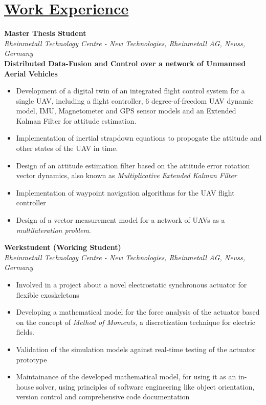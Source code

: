 
\section{\underline{Work Experience}}

\large{\textbf{Master Thesis Student}}
\hfill
\masterarbeitdate\\
\large{\emph{Rheinmetall Technology Centre - New Technologies, Rheinmetall AG, Neuss, Germany}}\\
\large{\textbf{Distributed Data-Fusion and Control over a network of Unmanned Aerial Vehicles}}
\begin{itemize}
    \item Development of a digital twin of an integrated flight control system for a single UAV, including a flight controller, 6 degree-of-freedom UAV dynamic model, IMU, Magnetometer and GPS sensor models and an Extended Kalman Filter for attitude estimation.
    \item Implementation of inertial strapdown equations to propogate the attitude and other states of the UAV in time.
    \item Design of an attitude estimation filter based on the attitude error rotation vector dynamics, also known as \emph{Multiplicative Extended Kalman Filter}
    \item Implementation of waypoint navigation algorithms for the UAV flight controller
    \item Design of a vector measurement model for a network of UAVs as a \emph{multilateration problem}.
\end{itemize}

\large{\textbf{Werkstudent (Working Student)}}
\hfill
\rheinmetalldate\\
\large{\emph{Rheinmetall Technology Centre - New Technologies, Rheinmetall AG, Neuss, Germany}}
\begin{itemize}
\item\large{Involved in a project about a novel electrostatic synchronous actuator for flexible exoskeletons}
\item\large{Developing a mathematical model for the force analysis of the actuator based on the concept of \emph{Method of Moments}, a discretization technique for electric fields.}
\item\large{Validation of the simulation models against real-time testing of the actuator prototype}
\item\large{Maintainance of the developed mathematical model, for using it as an in-house solver, using principles of software engineering like object orientation, version control and comprehensive code documentation}
\end{itemize}

